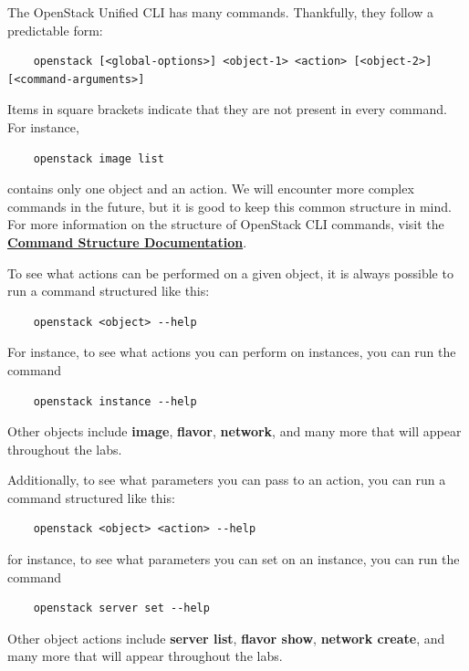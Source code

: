 \documentclass[letterpaper, 12pt]{article}
\begin{document}
The OpenStack Unified CLI has many commands.
Thankfully, they follow a predictable form:
\begin{lstlisting}
    openstack [<global-options>] <object-1> <action> [<object-2>] [<command-arguments>]
\end{lstlisting}
\noindent
Items in square brackets indicate that they are not present in every command.
For instance,
\begin{lstlisting}
    openstack image list
\end{lstlisting}
\noindent
contains only one object and an action.
We will encounter more complex commands in the future, but it is good to keep this common structure in mind.
For more information on the structure of OpenStack CLI commands, visit the \href{https://docs.openstack.org/python-openstackclient/latest/cli/commands.html}{\textbf{Command Structure Documentation}}.

To see what actions can be performed on a given object, it is always possible to run a command structured like this:
\begin{lstlisting}
    openstack <object> --help
\end{lstlisting}
\noindent
For instance, to see what actions you can perform on instances, you can run the command
\begin{lstlisting}
    openstack instance --help
\end{lstlisting}
\noindent
Other objects include \textbf{image}, \textbf{flavor}, \textbf{network}, and many more that will appear throughout the labs.

Additionally, to see what parameters you can pass to an action, you can run a command structured like this:
\begin{lstlisting}
    openstack <object> <action> --help
\end{lstlisting}
\noindent
for instance, to see what parameters you can set on an instance, you can run the command
\begin{lstlisting}
    openstack server set --help
\end{lstlisting}
\noindent
Other object actions include \textbf{server list}, \textbf{flavor show}, \textbf{network create}, and many more that will appear throughout the labs.
\end{document}
